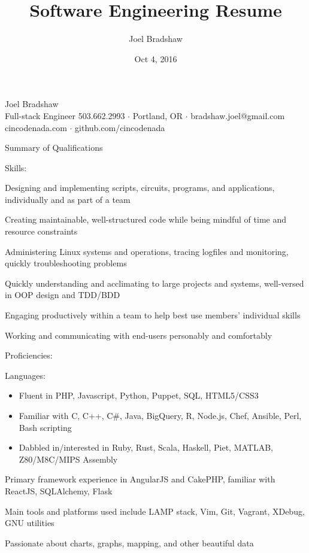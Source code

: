 \documentclass[letterpaper,10pt]{article}
\begin{document}
\title{Software Engineering Resume}
\author{Joel Bradshaw}
\date{Oct 4, 2016}
\begin{center}
{\Huge Joel Bradshaw}\\
\vskip 2pt
{\large Full-stack Engineer}
\vskip 4pt
{\large
    503.662.2993 \ensuremath{\cdot} Portland, OR \ensuremath{\cdot} bradshaw.joel@gmail.com\\
    cincodenada.com \ensuremath{\cdot} github.com/cincodenada}
\end{center}
\vskip -8pt

\begin{res_section}{Summary of Qualifications}
\begin{res_subsection}{Skills:}
  \item Designing and implementing scripts, circuits, programs, and applications, individually and as part of a team
  \item Creating maintainable, well-structured code while being mindful of time and resource constraints
  \item Administering Linux systems and operations, tracing logfiles and monitoring, quickly troubleshooting problems
  \item Quickly understanding and acclimating to large projects and systems, well-versed in OOP design and TDD/BDD
  \item Engaging productively within a team to help best use members' individual skills
  \item Working and communicating with end-users personably and comfortably
\end{res_subsection}
\begin{res_subsection}{Proficiencies:}
  \item Languages:
  \def \multicolsep {0pt}
  \setlength{\columnsep}{-8pt}
  \begin{itemize}
    \item Fluent in PHP, Javascript, Python, Puppet, SQL, HTML5/CSS3
    \item Familiar with C, C++, C\#, Java, BigQuery, R, Node.js, Chef, Ansible, Perl, Bash scripting
    \item Dabbled in/interested in Ruby, Rust, Scala, Haskell, Piet, MATLAB, Z80/M8C/MIPS Assembly
  \end{itemize}
  \item Primary framework experience in AngularJS and CakePHP, familiar with ReactJS, SQLAlchemy, Flask
  \item Main tools and platforms used include LAMP stack, Vim, Git, Vagrant, XDebug, GNU utilities
  \item Passionate about charts, graphs, mapping, and other beautiful data
\end{res_subsection}
\end{res_section}
\end{document}
